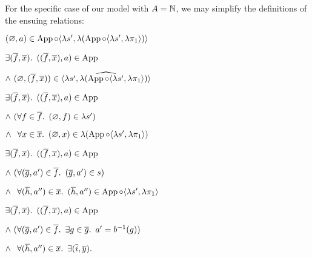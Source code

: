 For the specific case of our model with $A = \mathbb{N}$, we may simplify the definitions of the ensuing relations:
\begin{itemize}
  \step
    $(\varnothing,a)\in\operatorname{App}\circ\langle\lambda s^\prime,\lambda(\operatorname{App}\circ\langle\lambda s^\prime,\lambda\pi_1\rangle)\rangle$

  \step[\iffs]
    $\exists (\overline{f},\overline{x})\ldotp~((\overline{f},\overline{x}),a)\in\operatorname{App}$

  \addtolength{\itemsep}{-.5\baselineskip}
  \step
    \quad $\land~(\varnothing,(\overline{f},\overline{x}))\in\widehat{\langle\lambda s^\prime,\lambda(\operatorname{App}\circ\langle\lambda s^\prime,\lambda\pi_1\rangle)\rangle}$
  \addtolength{\itemsep}{.5\baselineskip}

  \step[\iffs]
    $\exists (\overline{f},\overline{x})\ldotp~((\overline{f},\overline{x}),a)\in\operatorname{App}$

  \addtolength{\itemsep}{-.5\baselineskip}
  \step
    \quad $\land~(\forall f\in\overline{f}\ldotp~(\varnothing,f)\in\lambda s^\prime)$

  \step
    \quad $\land~\phantom{(}\forall x\in\overline{x}\ldotp~(\varnothing,x)\in\lambda(\operatorname{App}\circ\langle\lambda s^\prime,\lambda\pi_1\rangle)$
  \addtolength{\itemsep}{.5\baselineskip}

  \step[\iffs]
    $\exists (\overline{f},\overline{x})\ldotp~((\overline{f},\overline{x}),a)\in\operatorname{App}$

  \addtolength{\itemsep}{-.5\baselineskip}
  \step
    \quad $\land~(\forall (\overline{g},a^\prime)\in\overline{f}\ldotp~(\overline{g},a^\prime)\in s)$
    \marginnote{\Def-$\lambda\cdot$}

  \step
    \quad $\land~\phantom{(}\forall (\overline{h},a^{\prime\prime})\in\overline{x}\ldotp~(\overline{h},a^{\prime\prime})\in\operatorname{App}\circ\langle\lambda s^\prime,\lambda\pi_1\rangle$
    \marginnote{\Def-$\lambda\cdot$}
  \addtolength{\itemsep}{.5\baselineskip}

  \step[\iffs]
    $\exists (\overline{f},\overline{x})\ldotp~((\overline{f},\overline{x}),a)\in\operatorname{App}$

  \addtolength{\itemsep}{-.5\baselineskip}
  \step
    \quad $\land~(\forall (\overline{g},a^\prime)\in\overline{f}\ldotp~\exists g\in\overline{g}\ldotp~a^\prime = b^{-1}(g))$

  \step
    \quad $\land~\phantom{(}\forall(\overline{h},a^{\prime\prime})\in\overline{x}\ldotp~\exists(\overline{i},\overline{y})\ldotp$
    \marginnote{\Def-\ref{def:crel-comp}}


\end{itemize}
